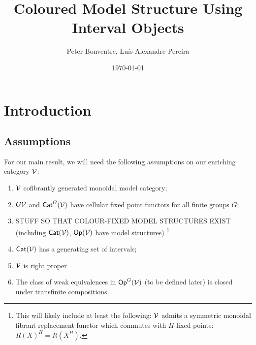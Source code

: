 \documentclass[psamsfonts,oneside,10pt,letterpaper
,draft
]{amsart}%
\author{Peter Bonventre, Lu\'is Alexandre Pereira}%
\title{Coloured Model Structure Using Interval Objects}%
\date{\today}
\renewcommand{\1}{\ensuremath{\mathbb{id}}}
\newcommand{\tall}{\ensuremath{\Rightarrow}}%
\begin{document}
		\maketitle%

\tableofcontents

\section{Introduction}%






\subsection{Assumptions}

For our main result, we will need the following assumptions on our enriching category $\mathcal V$:

\begin{enumerate}
\item $\mathcal V$  cofibrantly generated monoidal model category; %
\item $G\mathcal V$ and $\mathsf{Cat}^G(\mathcal V)$ have cellular fixed point functors for all finite groups $G$;
\item STUFF SO THAT COLOUR-FIXED MODEL STRUCTURES EXIST (including $\mathsf{Cat}(\mathcal V)$, $\mathsf{Op}(\mathcal V)$ have model structures) 
      \footnote{This will likely include at least the following:
      $\mathcal V$ admits a symmetric monoidal fibrant replacement functor which commutes with $H$-fixed points: $R(X)^H = R(X^H)$.}
\item $\mathsf{Cat}(\mathcal V)$ has a generating set of intervals;
\item $\mathcal V$ is right proper
\item The class of weak equivalences in $\mathsf{Op}^G(\mathcal V)$ (to be defined later) is closed under transfinite compositions.
\end{enumerate}
\end{document}
